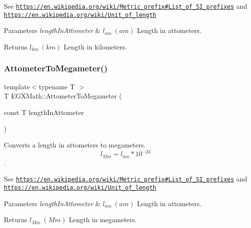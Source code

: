 See \href{https://en.wikipedia.org/wiki/Metric_prefix#List_of_SI_prefixes}{\tt https\+://en.\+wikipedia.\+org/wiki/\+Metric\+\_\+prefix\#\+List\+\_\+of\+\_\+\+S\+I\+\_\+prefixes} and \href{https://en.wikipedia.org/wiki/Unit_of_length}{\tt https\+://en.\+wikipedia.\+org/wiki/\+Unit\+\_\+of\+\_\+length} 
\begin{DoxyParams}{Parameters}
{\em length\+In\+Attometer} & $ l_{am}\ (am)$ Length in attometers. \\
\hline
\end{DoxyParams}
\begin{DoxyReturn}{Returns}
$ l_{km}\ (km)$ Length in kilometers. 
\end{DoxyReturn}
\mbox{\label{group___e_g_x_math-_conversions-_length_conversions-_attometer-_s_i_gad381bcfa61a8521acea1c79f84750a5d}} 
\subsubsection{\texorpdfstring{Attometer\+To\+Megameter()}{AttometerToMegameter()}}
{\footnotesize\ttfamily template$<$typename T $>$ \\
T E\+G\+X\+Math\+::\+Attometer\+To\+Megameter (\begin{DoxyParamCaption}\item[{const T}]{length\+In\+Attometer }\end{DoxyParamCaption})}



Converts a length in attometers to megameters. \[ l_{Mm}=l_{am} * 10^{-24} \]. 

See \href{https://en.wikipedia.org/wiki/Metric_prefix#List_of_SI_prefixes}{\tt https\+://en.\+wikipedia.\+org/wiki/\+Metric\+\_\+prefix\#\+List\+\_\+of\+\_\+\+S\+I\+\_\+prefixes} and \href{https://en.wikipedia.org/wiki/Unit_of_length}{\tt https\+://en.\+wikipedia.\+org/wiki/\+Unit\+\_\+of\+\_\+length} 
\begin{DoxyParams}{Parameters}
{\em length\+In\+Attometer} & $ l_{am}\ (am)$ Length in attometers. \\
\hline
\end{DoxyParams}
\begin{DoxyReturn}{Returns}
$ l_{Mm}\ (Mm)$ Length in megameters. 
\end{DoxyReturn}
\mbox{\label{group___e_g_x_math-_conversions-_length_conversions-_attometer-_s_i_gaa987cce911ce54c3022444537c705b97}} 
